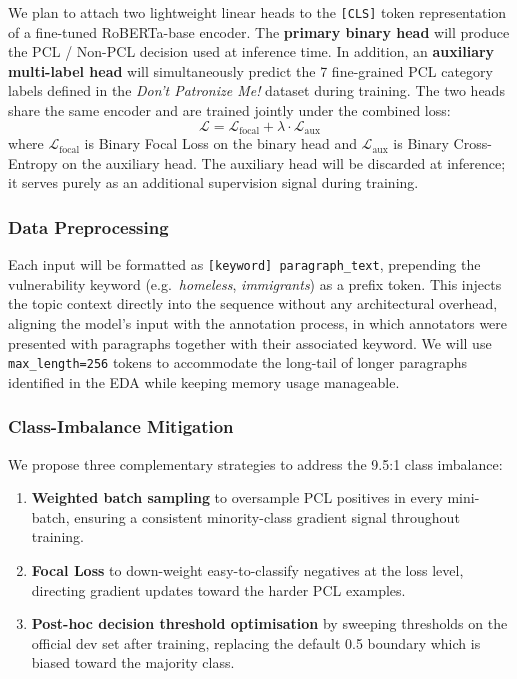 \documentclass[11pt,a4paper]{article}
\begin{document}
We plan to attach two lightweight linear heads to the \texttt{[CLS]} token representation of a fine-tuned RoBERTa-base encoder. The \textbf{primary binary head} will produce the PCL / Non-PCL decision used at inference time. In addition, an \textbf{auxiliary multi-label head} will simultaneously predict the 7 fine-grained PCL category labels defined in the \textit{Don't Patronize Me!} dataset \cite{perez-almendros-etal-2020-dont} during training. The two heads share the same encoder and are trained jointly under the combined loss:
\begin{equation}
    \mathcal{L} = \mathcal{L}_{\text{focal}} + \lambda \cdot \mathcal{L}_{\text{aux}}
\end{equation}
where $\mathcal{L}_{\text{focal}}$ is Binary Focal Loss \cite{lin2018focallossdenseobject} on the binary head and $\mathcal{L}_{\text{aux}}$ is Binary Cross-Entropy on the auxiliary head. The auxiliary head will be discarded at inference; it serves purely as an additional supervision signal during training.

\subsubsection{Data Preprocessing}

Each input will be formatted as \texttt{[keyword] paragraph\_text}, prepending the vulnerability keyword (e.g.\ \textit{homeless}, \textit{immigrants}) as a prefix token. This injects the topic context directly into the sequence without any architectural overhead, aligning the model's input with the annotation process, in which annotators were presented with paragraphs together with their associated keyword. We will use \texttt{max\_length=256} tokens to accommodate the long-tail of longer paragraphs identified in the EDA while keeping memory usage manageable.

\subsubsection{Class-Imbalance Mitigation}

We propose three complementary strategies to address the 9.5:1 class imbalance:

\begin{enumerate}[noitemsep]
    \item \textbf{Weighted batch sampling} to oversample PCL positives in every mini-batch, ensuring a consistent minority-class gradient signal throughout training.
    \item \textbf{Focal Loss} \cite{lin2018focallossdenseobject} to down-weight easy-to-classify negatives at the loss level, directing gradient updates toward the harder PCL examples.
    \item \textbf{Post-hoc decision threshold optimisation} by sweeping thresholds on the official dev set after training, replacing the default 0.5 boundary which is biased toward the majority class.
\end{enumerate}
\end{document}
